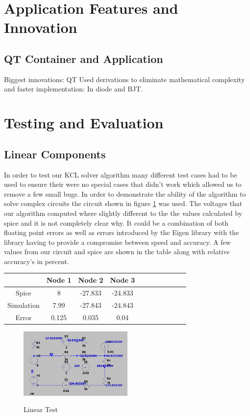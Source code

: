 \documentclass{article}
\begin{document}
\newpage
\section{Application Features and Innovation}
\newpage
\subsection{QT Container and Application}
Biggest innovations: 
QT
Used derivations to eliminate mathematical complexity and faster implementation: In diode and BJT. 



\section{Testing and Evaluation}
\subsection{Linear Components}
In order to test our KCL solver algorithm many different test cases had to be used to ensure their were no special cases that didn't work which allowed us to remove a few small bugs. In order to demonstrate the ability of the algorithm to solve complex circuits the circuit shown in figure \ref{fig:LinearTest} was used. The voltages that our algorithm computed where slightly different to the the values calculated by spice and it is not completely clear why. It could be a combination of both floating point errors as well as errors introduced by the Eigen library with the library having to provide a compromise between speed and accuracy. A few values from our circuit and spice are shown in the table along with relative accuracy's in percent. 
\begin{center}
\begin{tabular}{ ||c|| c |c | c | c | c | c | c | c | c | c ||}
 \hline
  & Node 1 & Node 2 & Node 3\\  
  \hline
 Spice & 8 & -27.833 & -24.833\\   
 Simulation & 7.99 & -27.843 & -24.843\\
 Error & 0.125 & 0.035 & 0.04\\ 
 \hline
\end{tabular}
\end{center}
\begin{figure}[h]
    \caption{Linear Test}
    \centering
    \includegraphics[width=0.5\textwidth]{images/LinearTest.png}
    \label{fig:LinearTest}
\end{figure}
\end{document}
